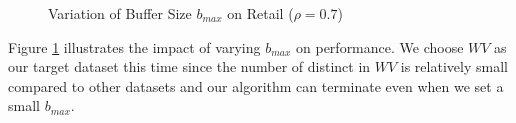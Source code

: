 \begin{figure}[th]
\centering
{}
\caption{Variation of Buffer Size $b_{max}$ on Retail ($\rho=0.7$)}\label{fig:buffersize}
\end{figure}

Figure \ref{fig:buffersize} illustrates
the impact of varying $b_{max}$ on performance.
We choose $WV$ as our target dataset this time since the number of
distinct \qids in $WV$ is relatively small compared to
other datasets and our algorithm
can terminate even when we set a small $b_{max}$.

